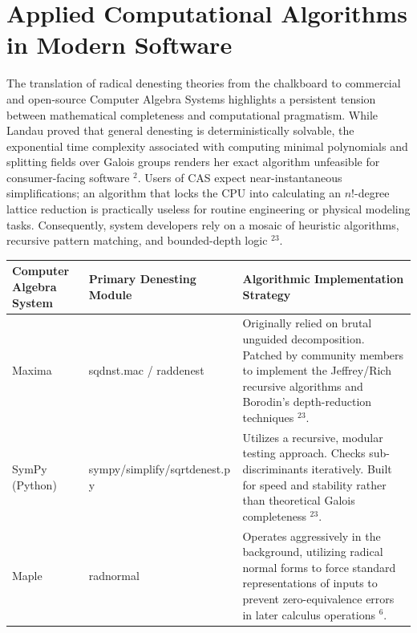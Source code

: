 \documentclass[10pt]{article}
\begin{document}
\section*{Applied Computational Algorithms in Modern Software}
The translation of radical denesting theories from the chalkboard to commercial and open-source Computer Algebra Systems highlights a persistent tension between mathematical completeness and computational pragmatism. While Landau proved that general denesting is deterministically solvable, the exponential time complexity associated with computing minimal polynomials and splitting fields over Galois groups renders her exact algorithm unfeasible for consumer-facing software ${ }^{2}$. Users of CAS expect near-instantaneous simplifications; an algorithm that locks the CPU into calculating an $n!$-degree lattice reduction is practically useless for routine engineering or physical modeling tasks. Consequently, system developers rely on a mosaic of heuristic algorithms, recursive pattern matching, and bounded-depth logic ${ }^{23}$.

\begin{center}
\begin{tabular}[t]{|l|l|l|}
\hline
Computer Algebra System & Primary Denesting Module & Algorithmic Implementation Strategy \\
\hline
Maxima & sqdnst.mac / raddenest & Originally relied on brutal unguided decomposition. Patched by community members to implement the Jeffrey/Rich recursive algorithms and Borodin's depth-reduction techniques ${ }^{23}$. \\
\hline
SymPy (Python) & sympy/simplify/sqrtdenest.p y & Utilizes a recursive, modular testing approach. Checks sub-discriminants iteratively. Built for speed and stability rather than theoretical Galois completeness ${ }^{23}$. \\
\hline
Maple & radnormal & Operates aggressively in the background, utilizing radical normal forms to force standard representations of inputs to prevent zero-equivalence errors in later calculus operations ${ }^{6}$. \\
\hline
\end{tabular}
\end{center}
\end{document}
